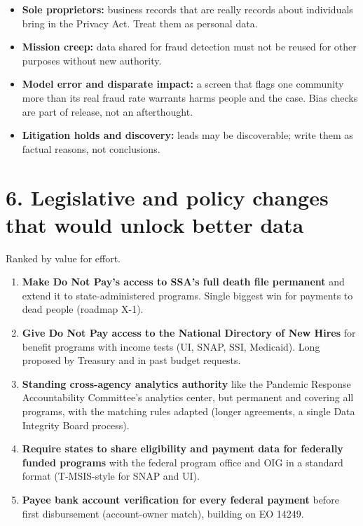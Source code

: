 \documentclass[letterpaper,11pt]{article}
\providecommand{\tightlist}{\setlength{\itemsep}{0pt}\setlength{\parskip}{0pt}}
\begin{document}
\begin{itemize}
\tightlist
\item
  \textbf{Sole proprietors:} business records that are really records
  about individuals bring in the Privacy Act. Treat them as personal
  data.
\item
  \textbf{Mission creep:} data shared for fraud detection must not be
  reused for other purposes without new authority.
\item
  \textbf{Model error and disparate impact:} a screen that flags one
  community more than its real fraud rate warrants harms people and the
  case. Bias checks are part of release, not an afterthought.
\item
  \textbf{Litigation holds and discovery:} leads may be discoverable;
  write them as factual reasons, not conclusions.
\end{itemize}

\hypertarget{legislative-and-policy-changes-that-would-unlock-better-data}{%
\section*{6. Legislative and policy changes that would unlock better
data}\label{legislative-and-policy-changes-that-would-unlock-better-data}}

Ranked by value for effort.

\begin{enumerate}
\def\labelenumi{\arabic{enumi}.}
\tightlist
\item
  \textbf{Make Do Not Pay's access to SSA's full death file permanent}
  and extend it to state-administered programs. Single biggest win for
  payments to dead people (roadmap X-1).
\item
  \textbf{Give Do Not Pay access to the National Directory of New Hires}
  for benefit programs with income tests (UI, SNAP, SSI, Medicaid). Long
  proposed by Treasury and in past budget requests.
\item
  \textbf{Standing cross-agency analytics authority} like the Pandemic
  Response Accountability Committee's analytics center, but permanent
  and covering all programs, with the matching rules adapted (longer
  agreements, a single Data Integrity Board process).
\item
  \textbf{Require states to share eligibility and payment data for
  federally funded programs} with the federal program office and OIG in
  a standard format (T-MSIS-style for SNAP and UI).
\item
  \textbf{Payee bank account verification for every federal payment}
  before first disbursement (account-owner match), building on EO 14249.
\end{enumerate}
\end{document}
